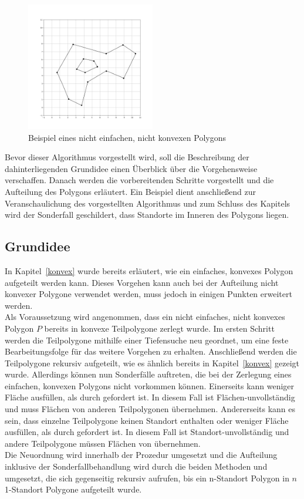 \documentclass[ngerman]{seminarbeitrag}
\begin{document}
\begin{figure}[h]
    \includegraphics[width=0.50\textwidth]{./Abbildungen/4.png}
    \centering
    \caption{Beispiel eines nicht einfachen, nicht konvexen Polygons}
    \label{viertes beispiel}
\end{figure}
Bevor dieser Algorithmus vorgestellt wird, soll die Beschreibung der dahinterliegenden Grundidee einen Überblick über die Vorgehensweise verschaffen. Danach werden die vorbereitenden Schritte vorgestellt und die Aufteilung des Polygons erläutert. Ein Beispiel dient anschließend zur Veranschaulichung des vorgestellten Algorithmus und zum Schluss des Kapitels wird der Sonderfall geschildert, dass Standorte im Inneren des Polygons liegen.

\subsection{Grundidee}\label{grundidee nicht konvex}
In Kapitel~\ref{konvex} wurde bereits erläutert, wie ein einfaches, konvexes Polygon aufgeteilt werden kann. Dieses Vorgehen kann auch bei der Aufteilung nicht konvexer Polygone verwendet werden, muss jedoch in einigen Punkten erweitert werden.\\
Als Voraussetzung wird angenommen, dass ein nicht einfaches, nicht konvexes Polygon $P$ bereits in konvexe Teilpolygone \cpp zerlegt wurde. Im ersten Schritt werden die Teilpolygone mithilfe einer Tiefensuche neu geordnet, um eine feste Bearbeitungsfolge für das weitere Vorgehen zu erhalten. Anschließend werden die Teilpolygone rekursiv aufgeteilt, wie es ähnlich bereits in Kapitel~\ref{konvex} gezeigt wurde. Allerdings können nun Sonderfälle auftreten, die bei der Zerlegung eines einfachen, konvexen Polygons nicht vorkommen können. Einerseits kann \cpi weniger Fläche ausfüllen, als durch gefordert ist. In diesem Fall ist \cpi Flächen-unvollständig und muss Flächen von anderen Teilpolygonen übernehmen. Andererseits kann es sein, dass einzelne Teilpolygone keinen Standort enthalten oder weniger Fläche ausfüllen, als durch gefordert ist. In diesem Fall ist \cpi Standort-unvollständig und andere Teilpolygone müssen Flächen von \cpi übernehmen.\\
Die Neuordnung wird innerhalb der Prozedur \ord umgesetzt und die Aufteilung inklusive der Sonderfallbehandlung wird durch die beiden Methoden \noncon und \daa umgesetzt, die sich gegenseitig rekursiv aufrufen, bis ein n-Standort Polygon in $n$ 1-Standort Polygone aufgeteilt wurde.
\end{document}
